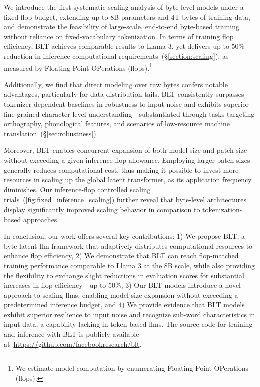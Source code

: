 We introduce the first systematic scaling analysis of byte-level models under a fixed flop budget, extending up to 8B parameters and 4T bytes of training data, and demonstrate the feasibility of large-scale, end-to-end byte-based training without reliance on fixed-vocabulary tokenization. In terms of training flop efficiency, {\textsc BLT} achieves comparable results to Llama 3, yet delivers up to 50\% reduction in inference computational requirements~(\S\ref{section:scaling}), as measured by Floating Point OPerations (flops).\footnote{We estimate model computation by enumerating Floating Point OPerations (flops).} 

Additionally, we find that direct modeling over raw bytes confers notable advantages, particularly for data distribution tails. {\textsc BLT} consistently surpasses tokenizer-dependent baselines in robustness to input noise and exhibits superior fine-grained character-level understanding—substantiated through tasks targeting orthography, phonological features, and scenarios of low-resource machine translation~(\S\ref{sec:robustness}). 

Moreover, {\textsc BLT} enables concurrent expansion of both model size and patch size without exceeding a given inference flop allowance. Employing larger patch sizes generally reduces computational cost, thus making it possible to invest more resources in scaling up the global latent transformer, as its application frequency diminishes. Our inference-flop controlled scaling trials~(\autoref{fig:fixed_inference_scaling}) further reveal that byte-level architectures display significantly improved scaling behavior in comparison to tokenization-based approaches.

In conclusion, our work offers several key contributions: 1) We propose {\textsc BLT}, a byte latent llm framework that adaptively distributes computational resources to enhance flop efficiency, 2) We demonstrate that {\textsc BLT} can reach flop-matched training performance comparable to Llama 3 at the 8B scale, while also providing the flexibility to exchange slight reductions in evaluation scores for substantial increases in flop efficiency—up to 50\%, 3) Our {\textsc BLT} models introduce a novel approach to scaling llms, enabling model size expansion without exceeding a predetermined inference budget, and 4) We provide evidence that {\textsc BLT} models exhibit superior resilience to input noise and recognize sub-word characteristics in input data, a capability lacking in token-based llms. The source code for training and inference with {\textsc BLT} is publicly available at~\url{https://github.com/facebookresearch/blt}.

